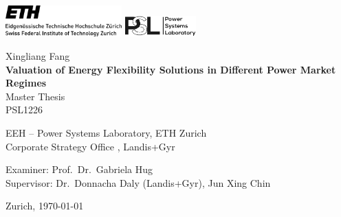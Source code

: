 \begin{titlepage}
\begin{center}

\includegraphics[height=12mm]{Figures/eth_logo_lang_pos}
\hfill
\includegraphics[height=8mm]{Figures/PSL_logo}

\vspace{30mm} Xingliang Fang \\
\vspace{10mm} \textbf{\LARGE Valuation of Energy Flexibility Solutions in Different Power Market Regimes} \\
\vspace{10mm} Master Thesis \\ PSL1226


\vfill

EEH -- Power Systems Laboratory, ETH Zurich \\
Corporate Strategy Office , Landis+Gyr

\vspace{5mm}

Examiner: Prof.~Dr.~Gabriela Hug \\
Supervisor: Dr.~Donnacha Daly (Landis+Gyr), Jun Xing Chin


\vspace{5mm} Zurich, \today

\end{center}
\end{titlepage}
